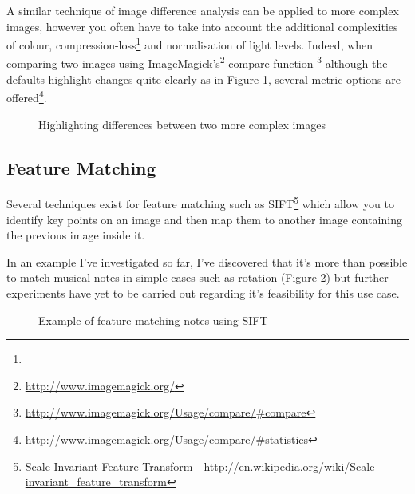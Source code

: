 A similar technique of image difference analysis can be applied to more complex images, however you often have to take into account the additional complexities of colour, compression-loss\footnote{} and normalisation of light levels. Indeed, when comparing two images using ImageMagick's\footnote{\url{http://www.imagemagick.org/}} compare function \footnote{\url{http://www.imagemagick.org/Usage/compare/\#compare}} although the defaults highlight changes quite clearly as in Figure \ref{fig:KittenDiff}, several metric options are offered\footnote{\url{http://www.imagemagick.org/Usage/compare/\#statistics}}.

\begin{figure}[h!]
  \centering
  \caption{Highlighting differences between two more complex images}
  \label{fig:KittenDiff}
\end{figure}


\subsection{Feature Matching}

Several techniques exist for feature matching such as SIFT\footnote{Scale Invariant Feature Transform - \url{http://en.wikipedia.org/wiki/Scale-invariant_feature_transform}} which allow you to identify key points on an image and then map them to another image containing the previous image inside it.

In an example I've investigated so far, I've discovered that it's more than possible to match musical notes in simple cases such as rotation (Figure \ref{fig:NoteRotate}) but further experiments have yet to be carried out regarding it's feasibility for this use case.


\begin{figure}[h!]
  \centering
  \caption{Example of feature matching notes using SIFT}
  \label{fig:NoteRotate}
\end{figure}

